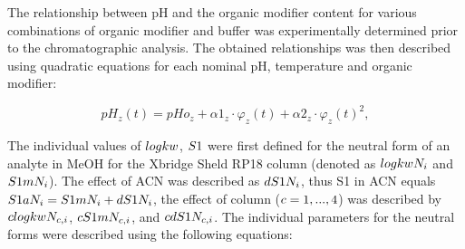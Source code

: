 \documentclass[
]{article}
\begin{document}
The relationship between pH and the organic modifier content for various
combinations of organic modifier and buffer was experimentally
determined prior to the chromatographic analysis. The obtained
relationships was then described using quadratic equations for each
nominal pH, temperature and organic modifier:

\[
pH_z(t)=pHo_z+\alpha 1_z\cdot \varphi_z(t)+\alpha2_z\cdot {\varphi_z(t)}^2,
\]

The individual values of \(\small logkw\), \(\small S1\) were first
defined for the neutral form of an analyte in MeOH for the Xbridge Sheld
RP18 column (denoted as \(\small logkwN_i\) and \(\small S1mN_i\)). The
effect of ACN was described as \(\small dS1N_i\), thus S1 in ACN equals
\(\small S1aN_i = S1mN_i +dS1N_i\), the effect of column
(\(\small c=1,...,4\)) was described by \(\small clogkwN_{c,i}\),
\(\small cS1mN_{c,i}\), and \(\small cdS1N_{c,i}\). The individual
parameters for the neutral forms were described using the following
equations:
\end{document}
